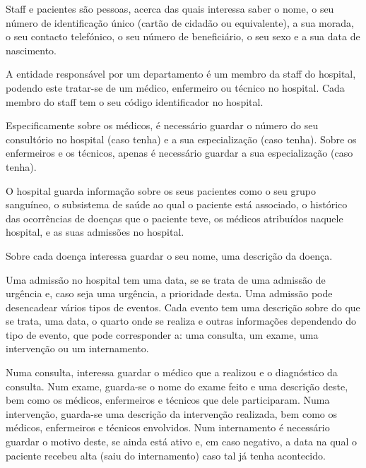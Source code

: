 \documentclass[article, a4paper, 12pt, oneside]{memoir}
\begin{document}
Staff e pacientes são pessoas, acerca das quais interessa saber o nome, o seu número de identificação único (cartão de cidadão ou equivalente), a sua morada, o seu contacto telefónico, o seu número de beneficiário, o seu sexo e a sua data de nascimento.

A entidade responsável por um departamento é um membro da staff do hospital, podendo este tratar-se de um médico, enfermeiro ou técnico no hospital. Cada membro do staff tem o seu código identificador no hospital.

Especificamente sobre os médicos, é necessário guardar o número do seu consultório no hospital (caso tenha) e a sua especialização (caso tenha).
Sobre os enfermeiros e os técnicos, apenas é necessário guardar a sua especialização (caso tenha).

O hospital guarda informação sobre os seus pacientes como o seu grupo sanguíneo, o subsistema de saúde ao qual o paciente está associado, o histórico das ocorrências de doenças que o paciente teve, os médicos atribuídos naquele hospital, e as suas admissões no hospital.

Sobre cada doença interessa guardar o seu nome, uma descrição da doença.

Uma admissão no hospital tem uma data, se se trata de uma admissão de urgência e, caso seja uma urgência, a prioridade desta. Uma admissão pode desencadear vários tipos de eventos. Cada evento tem uma descrição sobre do que se trata, uma data, o quarto onde se realiza e outras informações dependendo do tipo de evento, que pode corresponder a: uma consulta, um exame, uma intervenção ou um internamento.

Numa consulta, interessa guardar o médico que a realizou e o diagnóstico da consulta.
Num exame, guarda-se o nome do exame feito e uma descrição deste, bem como os médicos, enfermeiros e técnicos que dele participaram.
Numa intervenção, guarda-se uma descrição da intervenção realizada, bem como os médicos, enfermeiros e técnicos envolvidos.
Num internamento é necessário guardar o motivo deste, se ainda está ativo e, em caso negativo, a data na qual o paciente recebeu alta (saiu do internamento) caso tal já tenha acontecido.

\newpage
\end{document}
